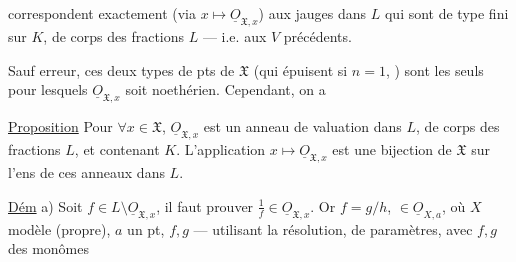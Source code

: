 correspondent exactement (via $x\longmapsto\underline{O}_{\mathfrak X,x}$) aux jauges dans $L$ qui sont  de type fini sur $K$, de corps des fractions $L$ --- i.e. aux $V$ précédents.

Sauf erreur, ces deux types de pts de $\mathfrak X$ (qui épuisent  si $n=1$, ) sont les seuls pour lesquels $\underline{O}_{\mathfrak X,x}$ soit noethérien. Cependant, on a

\margin{$\big|$}
\uline{Proposition} Pour $\forall x\in\mathfrak X$, $\underline{O}_{\mathfrak X,x}$ est un anneau de valuation dans $L$, de corps des fractions $L$, et contenant $K$. L'application $x\longmapsto\underline{O}_{\mathfrak X,x}$ est une bijection de $\mathfrak X$ sur l'ens de ces anneaux dans $L$.

\uline{Dém} a) Soit $f\in L\setminus\underline{O}_{\mathfrak X,x}$, il faut prouver $\frac1f\in\underline{O}_{\mathfrak X,x}$. Or $f=g/h$, $\in\underline{O}_{X,a}$, où $X$ modèle  (propre), $a$ un pt, $f,g$  --- utilisant la résolution,   de paramètres, avec $f,g$ des monômes
